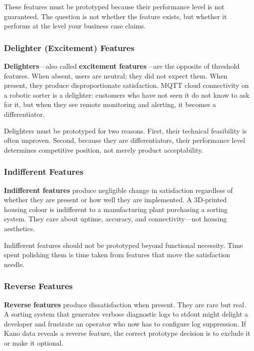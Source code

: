 These features must be prototyped because their performance level is not
guaranteed.
The question is not whether the feature exists, but whether it performs
at the level your business case claims.

\subsubsection{Delighter (Excitement) Features}
\textbf{Delighters}---also called \textbf{excitement features}---are the
opposite of threshold features.
When absent, users are neutral; they did not expect them.
When present, they produce disproportionate satisfaction.
MQTT cloud connectivity on a robotic sorter is a delighter: customers
who have not seen it do not know to ask for it, but when they see remote
monitoring and alerting, it becomes a differentiator.

Delighters must be prototyped for two reasons.
First, their technical feasibility is often unproven.
Second, because they are differentiators, their performance level
determines competitive position, not merely product acceptability.

\subsubsection{Indifferent Features}
\textbf{Indifferent features} produce negligible change in satisfaction
regardless of whether they are present or how well they are implemented.
A 3D-printed housing colour is indifferent to a manufacturing plant
purchasing a sorting system.
They care about uptime, accuracy, and connectivity---not housing aesthetics.

Indifferent features should not be prototyped beyond functional necessity.
Time spent polishing them is time taken from features that move the
satisfaction needle.

\subsubsection{Reverse Features}
\textbf{Reverse features} produce dissatisfaction when present.
They are rare but real.
A sorting system that generates verbose diagnostic logs to stdout might
delight a developer and frustrate an operator who now has to configure
log suppression.
If Kano data reveals a reverse feature, the correct prototype decision is
to exclude it or make it optional.

